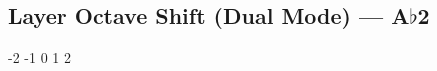 \subsection[Layer Octave Shift (Dual Mode)]{Layer Octave Shift (Dual Mode) --- \UiKey{\SET}A$\flat$2}







































-2
-1
0
1
2
